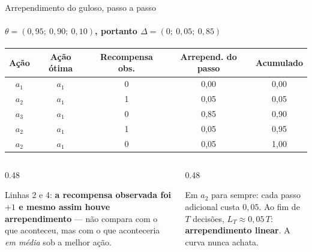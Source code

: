 \documentclass[aspectratio=169, 10pt]{beamer}
\newcommand{\gap}{\Delta}
\newcommand{\Reg}{L}
\begin{document}
\begin{frame}{Arrependimento do guloso, passo a passo}
  \framesubtitle{$\theta = (0{,}95;\ 0{,}90;\ 0{,}10)$, portanto $\gap = (0;\ 0{,}05;\ 0{,}85)$}

  \centering
  \begin{tabular}{ccccc}
    \toprule
    \textbf{Ação} & \textbf{Ação ótima} & \textbf{Recompensa obs.}
      & \textbf{Arrepend. do passo} & \textbf{Acumulado} \\
    \midrule
    $a_1$ & $a_1$ & 0 & 0{,}00 & 0{,}00 \\
    $a_2$ & $a_1$ & 1 & 0{,}05 & 0{,}05 \\
    $a_3$ & $a_1$ & 0 & 0{,}85 & 0{,}90 \\
    $a_2$ & $a_1$ & 1 & 0{,}05 & 0{,}95 \\
    $a_2$ & $a_1$ & 0 & 0{,}05 & 1{,}00 \\
    \bottomrule
  \end{tabular}

  \vspace{0.8em}
  \begin{columns}[T]
    \begin{column}{0.48\textwidth}
      \begin{alertabox}
        Linhas 2 e 4: \textbf{a recompensa observada foi $+1$ e mesmo assim
        houve arrependimento} — não compara com o que aconteceu, mas com o
        que aconteceria \emph{em média} sob a melhor ação.
      \end{alertabox}
    \end{column}
    \begin{column}{0.48\textwidth}
      \begin{ideiabox}
        Em $a_2$ para sempre: cada passo adicional custa $0{,}05$. Ao fim
        de $T$ decisões, $\Reg_T \approx 0{,}05\,T$: \textbf{arrependimento
        linear}. A curva nunca achata.
      \end{ideiabox}
    \end{column}
  \end{columns}
\end{frame}
\end{document}
